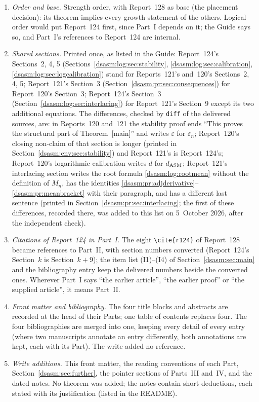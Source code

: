 \documentclass[11pt,letterpaper]{article}
\theoremstyle{remark}\newtheorem{remark}[theorem]{Remark}
\newcommand{\eps}{\varepsilon}\newcommand{\HH}{\mathcal H}\newcommand{\one}{\mathbf1}
\begin{document}
\begin{enumerate}
\item \emph{Order and base.} Strength order, with Report~128 as base (the placement decision): its theorem implies every growth statement of the others. Logical order would put Report~124 first, since Part~I depends on it; the Guide says so, and Part~I's references to Report~124 are internal.
\item \emph{Shared sections.} Printed once, as listed in the Guide: Report~124's Sections~2, 4, 5 (Sections~\ref{dsasm:log:sec:stability}, \ref{dsasm:log:sec:calibration}, \ref{dsasm:log:sec:logcalibration}) stand for Reports~121's and~120's Sections~2, 4, 5; Report~121's Section~3 (Section~\ref{dsasm:pr:sec:consequences}) for Report~120's Section~3; Report~124's Section~3 (Section~\ref{dsasm:log:sec:interlacing}) for Report~121's Section~9 except its two additional equations. The differences, checked by \texttt{diff} of the delivered sources, are: in Reports~120 and~121 the stability proof ends ``This proves the structural part of Theorem~[main]'' and writes $\eps$ for $\eps_n$; Report~120's closing non-claim of that section is longer (printed in Section~\ref{dsasm:env:sec:stability}) and Report~121's is Report~124's; Report~120's logarithmic calibration writes $d$ for $d_{\rm ASM}$; Report~121's interlacing section writes the root formula \eqref{dsasm:log:rootmean} without the definition of $M_n$, has the identities \eqref{dsasm:pr:adjderivative}--\eqref{dsasm:pr:meanbracket} with their paragraph, and has a different last sentence (printed in Section~\ref{dsasm:pr:sec:interlacing}; the first of these differences, recorded there, was added to this list on 5~October 2026, after the independent check).
\item \emph{Citations of Report~124 in Part~I.} The eight \verb|\cite{r124}| of Report~128 became references to Part~II, with section numbers converted (Report~124's Section~$k$ is Section~$k+9$); the item list (I1)--(I4) of Section~\ref{dsasm:sec:main} and the bibliography entry keep the delivered numbers beside the converted ones. Wherever Part~I says ``the earlier article'', ``the earlier proof'' or ``the supplied article'', it means Part~II.
\item \emph{Front matter and bibliography.} The four title blocks and abstracts are recorded at the head of their Parts; one table of contents replaces four. The four bibliographies are merged into one, keeping every detail of every entry (where two manuscripts annotate an entry differently, both annotations are kept, each with its Part). The write added no reference.
\item \emph{Write additions.} This front matter, the reading conventions of each Part, Section~\ref{dsasm:sec:further}, the pointer sections of Parts~III and~IV, and the dated notes. No theorem was added; the notes contain short deductions, each stated with its justification (listed in the README).
\end{enumerate}
\end{document}
